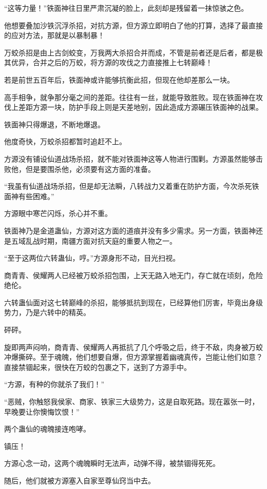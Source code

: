 \begin{this_body}
“这等力量！”铁面神往日里严肃沉凝的脸上，此刻却是残留着一抹惊骇之色。

他想要叠加沙铁沉浮杀招，对抗方源，但方源立即明白了他的打算，选择了最直接的应对方法，那就是以暴制暴！

万蛟杀招是由上古剑蛟变，万我两大杀招合并而成，不管是前者还是后者，都是极其优异，合并之后的万蛟，将方源的攻伐之力直接推上七转巅峰！

若是前世五百年后，铁面神或许能够抗衡此招，但现在他却差那么一块。

高手相争，就争那分毫之间的差距。往往有一丝，就能导致胜败。现在铁面神在攻伐上差距方源一块，防护手段上则是天差地别，因此造成方源碾压铁面神的战果。

铁面神只得爆退，不断地爆退。

他度奇快，万蛟杀招都暂时追赶不上。

方源没有铺设仙道战场杀招，就不能对铁面神这等人物进行围剿。方源虽然能够击败他，但是要围杀他，必须要有这方面的准备。

“我虽有仙道战场杀招，但是却无法瞬，八转战力又着重在防护方面，今次杀死铁面神有些困难。”

方源眼中寒芒闪烁，杀心并不重。

铁面神乃是金道蛊仙，方源对这方面的道痕并没有多少需求。另一方面，铁面神还是五域乱战时期，南疆方面对抗天庭的重要人物之一。

“至于这两位六转蛊仙，哼。”方源身形不动，目光扫视。

商青青、侯耀两人已经被万蛟杀招包围，上天无路入地无门，存亡就在顷刻，危险绝伦。

六转蛊仙面对这七转巅峰的杀招，能够抵抗到现在，已经算他们厉害，毕竟出身级势力，乃是六转中的精英。

砰砰。

旋即两声闷响，商青青、侯耀两人再抵抗了几个呼吸之后，终于不敌，肉身被万蛟冲爆撕碎。至于魂魄，他们想要自爆，但方源掌握着幽魂真传，岂能让他们如意？直接禁锢起来，很快在万蛟的包裹之下，送到了方源手中。

“方源，有种的你就杀了我们！”

“恶贼，你触怒我侯家、商家、铁家三大级势力，这是自取死路。现在嚣张一时，早晚要让你懊悔饮恨！”

两个蛊仙的魂魄接连咆哮。

镇压！

方源心念一动，这两个魂魄瞬时无法声，动弹不得，被禁锢得死死。

随后，他们就被方源塞入自家至尊仙窍当中去。


\end{this_body}
